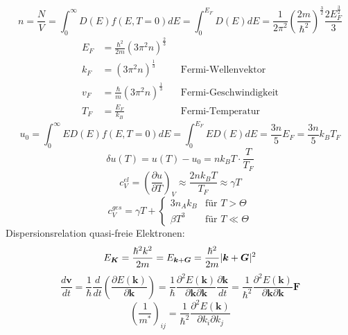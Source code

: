 \documentclass[11pt]{article}
\DeclarePairedDelimiter\abs{\lvert}{\rvert}
\begin{document}
\begin{equation}
  n=\frac{N}{V}=\int_0^\infty D(E)f(E,T=0)dE=\int_0^{E_F}D(E)dE=\frac{1}{2\pi^2}
  \left( \frac{2m}{\hbar^2}\right)^{\frac{3}{2}}\frac{2E_F^{\frac{3}{2}}}{3}
\end{equation}
\begin{equation}
  \begin{align}
    E_F&=\frac{\hbar^2}{2m}(3\pi^2n)^{\frac{2}{3}} \\
    k_F&=(3\pi^2n)^{\frac{1}{3}}\quad &\text{Fermi-Wellenvektor} \\
    v_F&=\frac{\hbar}{m}(3\pi^2n)^{\frac{1}{3}}\quad &\text{Fermi-Geschwindigkeit} \\
    T_F&=\frac{E_F}{k_B}\quad &\text{Fermi-Temperatur}
  \end{align}
\end{equation}
\begin{equation}
  u_0=\int_0^\infty ED(E)f(E,T=0)dE=\int_0^{E_F}ED(E)dE=\frac{3n}{5}E_F=
  \frac{3n}{5}k_BT_F
\end{equation}
\begin{equation}
  \delta u(T)=u(T)-u_0=nk_BT\cdot\frac{T}{T_F}
\end{equation}
\begin{equation}
  c_V^{el}=\left(\frac{\partial u}{\partial T}\right)_V\approx\frac{2nk_BT}{T_F}
  \approx\gamma T
\end{equation}
\begin{equation}
  c_V^{ges}=\gamma T + \begin{cases}
  3n_Ak_B & \text{für } T>\Theta \\
  \beta T^3 & \text{für } T\ll\Theta
  \end{cases}
\end{equation}
Dispersionsrelation quasi-freie Elektronen:
\begin{equation}
  E_{\bm{K}}=\frac{\hbar^2k^2}{2m}=E_{\bm{k}+\bm{G}}=\frac{\hbar^2}{2m}
  \abs{\bm{k}+\bm{G}}^2
\end{equation}
\begin{equation}
  \frac{d\bm{v}}{dt}=\frac{1}{\hbar}\frac{d}{dt}\left(\frac{\partial E(\bm{k})}
  {\partial\bm{k}}\right)=\frac{1}{\hbar}\frac{\partial^2E(\bm{k})}
  {\partial\bm{k}\partial\bm{k}}\frac{\partial\bm{k}}{dt}=
  \frac{1}{\hbar^2}\frac{\partial^2E(\bm{k})}
  {\partial\bm{k}\partial\bm{k}}\bm{F}
\end{equation}
\begin{equation}
  \left(\frac{1}{m^*}\right)_{ij}=\frac{1}{\hbar^2}\frac{\partial^2E(\bm{k})}
  {\partial k_i\partial k_j}
\end{equation}
\end{document}
